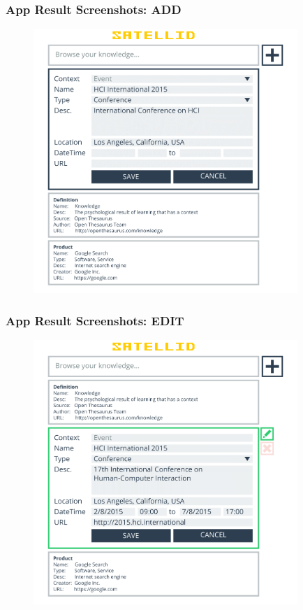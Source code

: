 \documentclass[10pt, compress]{beamer}
\begin{document}

\begin{frame}[fragile]
  \frametitle{App Result Screenshots: ADD}

  \begin{figure}[ht]
    \centering
    \vspace{-1cm}
    \includegraphics[height=10cm]{include/satellid-app-results_add.png}
    \vspace{-10pt}
    \label{fig:satellid-app-results_add}
  \end{figure}

\end{frame}


\begin{frame}[fragile]
  \frametitle{App Result Screenshots: EDIT}

  \begin{figure}[ht]
    \centering
    \vspace{-1cm}
    \includegraphics[height=10cm]{include/satellid-app-results_edit.png}
    \label{fig:satellid-app-results_edit}
  \end{figure}

\end{frame}
\end{document}
